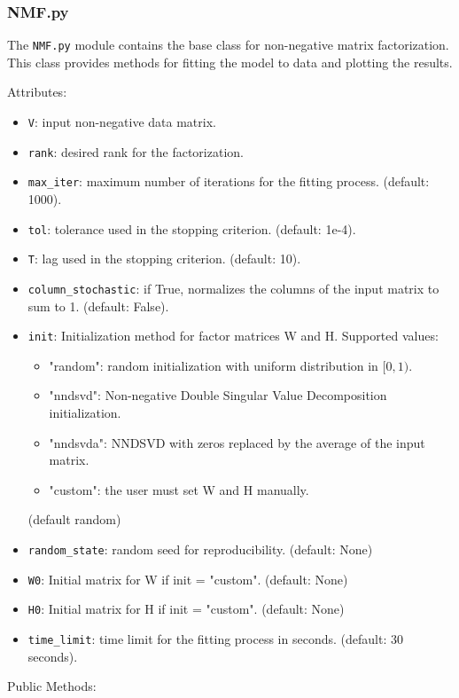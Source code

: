 \subsubsection{NMF.py}
The \texttt{NMF.py} module contains the base class for non-negative matrix factorization. This class provides methods for fitting the model to data and plotting the results.
\par
Attributes:
\begin{itemize}
    \item \texttt{V}: input non-negative data matrix.
    \item \texttt{rank}: desired rank for the factorization.
    \item \texttt{max\_iter}: maximum number of iterations for the fitting process. (default: 1000).
    \item \texttt{tol}: tolerance used in the stopping criterion. (default: 1e-4).
    \item \texttt{T}: lag used in the stopping criterion. (default: 10).
    \item \texttt{column\_stochastic}: if True, normalizes the columns of the input matrix to sum to 1. (default: False).
    \item \texttt{init}: Initialization method for factor matrices W and H. Supported values:
        \begin{itemize}
        \item "random": random initialization with uniform distribution in $[0,1)$.
        \item "nndsvd": Non-negative Double Singular Value Decomposition initialization.
        \item "nndsvda": NNDSVD with zeros replaced by the average of the input matrix.
        \item "custom": the user must set W and H manually.
    \end{itemize} (default random)
    \item \texttt{random\_state}: random seed for reproducibility. (default: None)
    \item \texttt{W0}: Initial matrix for W if init = "custom". (default: None)
    \item \texttt{H0}: Initial matrix for H if init = "custom". (default: None)
    \item \texttt{time\_limit}: time limit for the fitting process in seconds. (default: 30 seconds).
\end{itemize}
Public Methods:
